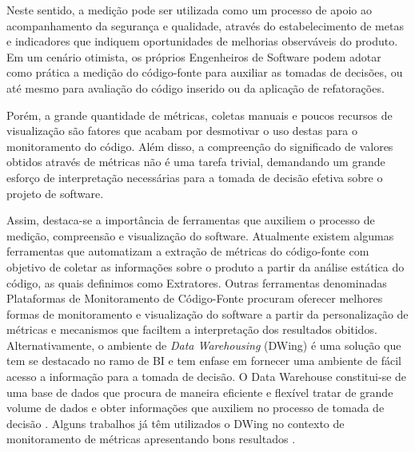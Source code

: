 %

Neste sentido, a medição pode ser utilizada como um processo de apoio ao acompanhamento da segurança e qualidade, através do estabelecimento de metas e indicadores que indiquem oportunidades de melhorias observáveis do produto. Em um cenário otimista, os próprios Engenheiros de Software podem adotar como prática a medição do código-fonte para auxiliar as tomadas de decisões, ou até mesmo para avaliação do código inserido ou da aplicação de refatorações.


Porém, a grande quantidade de métricas, coletas manuais e poucos recursos de visualização são fatores que acabam por desmotivar o uso destas para o monitoramento do código. Além disso, a compreenção do significado de valores obtidos através de métricas não é uma tarefa trivial, demandando um grande esforço de interpretação necessárias para a tomada de decisão efetiva sobre o projeto de software.

%

Assim, destaca-se a importância de ferramentas que auxiliem o processo de medição, compreensão e visualização do software. Atualmente existem algumas ferramentas que automatizam a extração de métricas do código-fonte com objetivo de coletar as informações sobre o produto a partir da análise estática do código, as quais definimos como Extratores. Outras ferramentas denominadas Plataformas de Monitoramento de Código-Fonte procuram oferecer melhores formas de monitoramento e visualização do software a partir da personalização de métricas e mecanismos que faciltem a interpretação dos resultados obitidos. Alternativamente, o ambiente de \emph{Data Warehousing} (DWing) é uma solução que tem se destacado no ramo de BI e tem enfase em fornecer uma ambiente de fácil acesso a informação para a tomada de decisão. O Data Warehouse constitui-se de uma base de dados que procura de maneira eficiente e flexível tratar de grande volume de dados e obter informações que auxiliem no processo de tomada de decisão \cite{lopes2007}. Alguns trabalhos já têm utilizados o DWing no contexto de monitoramento de métricas apresentando bons resultados  \cite{Castellanos2005} \cite{Folleco2007} \cite{Silveira2010}\cite{mazuco2011}.

%

